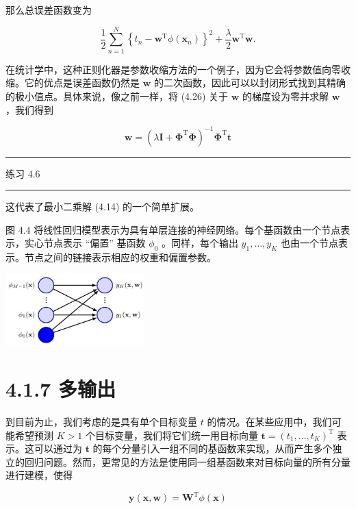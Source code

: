 \documentclass[10pt]{report}
\newcommand{\HRule}{\begin{center}\rule{0.9\linewidth}{0.2mm}\end{center}}
\begin{document}
那么总误差函数变为

\[
\frac{1}{2}\mathop{\sum }\limits_{{n = 1}}^{N}{\left\{  {t}_{n} - {\mathbf{w}}^{\mathrm{T}}\phi \left( {\mathbf{x}}_{n}\right) \right\}  }^{2} + \frac{\lambda }{2}{\mathbf{w}}^{\mathrm{T}}\mathbf{w}. \tag{4.26}
\]

在统计学中，这种正则化器是参数收缩方法的一个例子，因为它会将参数值向零收缩。它的优点是误差函数仍然是 \(\mathbf{w}\) 的二次函数，因此可以以封闭形式找到其精确的极小值点。具体来说，像之前一样，将 (4.26) 关于 \(\mathbf{w}\) 的梯度设为零并求解 \(\mathbf{w}\) ，我们得到

\[
\mathbf{w} = {\left( \lambda \mathbf{I} + {\mathbf{\Phi }}^{\mathrm{T}}\mathbf{\Phi }\right) }^{-1}{\mathbf{\Phi }}^{\mathrm{T}}\mathbf{t} \tag{4.27}
\]

\HRule

练习 4.6

\HRule

这代表了最小二乘解 (4.14) 的一个简单扩展。

图 4.4 将线性回归模型表示为具有单层连接的神经网络。每个基函数由一个节点表示，实心节点表示 “偏置” 基函数 \({\phi }_{0}\) 。同样，每个输出 \({y}_{1},\ldots ,{y}_{K}\) 也由一个节点表示。节点之间的链接表示相应的权重和偏置参数。

\begin{center}
\includegraphics[max width=0.4\textwidth]{images/0194e279-9b28-703a-88f4-c3ac21e2010d_138_972_344_567_294_0.jpg}
\end{center}
\hspace*{3em} 

\section*{4.1.7 多输出}

到目前为止，我们考虑的是具有单个目标变量 \(t\) 的情况。在某些应用中，我们可能希望预测 \(K > 1\) 个目标变量，我们将它们统一用目标向量 \(\mathbf{t} = {\left( {t}_{1},\ldots ,{t}_{K}\right) }^{\mathrm{T}}\) 表示。这可以通过为 \(\mathbf{t}\) 的每个分量引入一组不同的基函数来实现，从而产生多个独立的回归问题。然而，更常见的方法是使用同一组基函数来对目标向量的所有分量进行建模，使得

\[
\mathbf{y}\left( {\mathbf{x},\mathbf{w}}\right)  = {\mathbf{W}}^{\mathrm{T}}\phi \left( \mathbf{x}\right)  \tag{4.28}
\]
\end{document}
